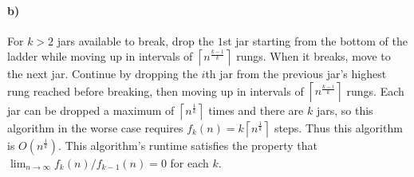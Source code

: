 \documentclass[12pt]{article}
\begin{document}
\paragraph{b)}
For \(k>2\) jars available to break, drop the \(1\)st jar starting from the bottom of the ladder while moving up in intervals of \(\left\lceil n^\frac{k-1}{k}\right\rceil\)
rungs. When it breaks, move to the next jar. Continue by dropping the \(i\)th jar from the previous jar's highest rung reached before breaking, then moving up in intervals
of \(\left\lceil n^\frac{k-i}{k}\right\rceil\) rungs. Each jar can be dropped a maximum of \(\left\lceil n^\frac{1}{k}\right\rceil\) times and there are \(k\) jars, so
this algorithm in the worse case requires \(f_k(n)=k \left\lceil n^\frac{1}{k}\right\rceil\) steps. Thus this algorithm is \(O\left(n^\frac{1}{k}\right)\). This algorithm's
runtime satisfies the property that \(\lim_{n\to\infty} f_k(n)/f_{k-1}(n)=0\) for each \(k\).
\end{document}
